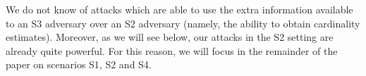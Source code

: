 \documentclass{article}
\begin{document}
We do not know of attacks which are able to use the extra information available to an S3 adversary over an S2 adversary (namely, the ability to obtain cardinality estimates). Moreover, as we will see below, our attacks in the S2 setting are already quite powerful. For this reason, we will focus in the remainder of the paper on scenarios S1, S2 and S4.

\end{document}
